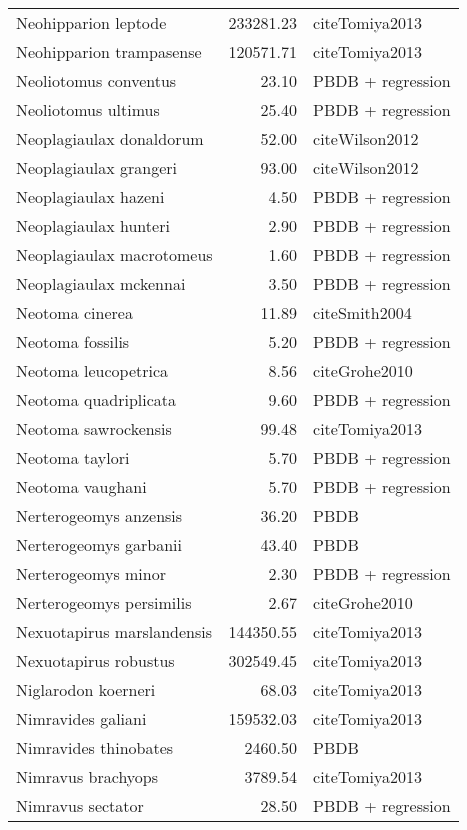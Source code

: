 \begin{table}[ht]
\begin{tabular}{lrl}
  Neohipparion leptode & 233281.23 & cite{Tomiya2013} \\ 
  Neohipparion trampasense & 120571.71 & cite{Tomiya2013} \\ 
  Neoliotomus conventus & 23.10 & PBDB + regression \\ 
  Neoliotomus ultimus & 25.40 & PBDB + regression \\ 
  Neoplagiaulax donaldorum & 52.00 & cite{Wilson2012} \\ 
  Neoplagiaulax grangeri & 93.00 & cite{Wilson2012} \\ 
  Neoplagiaulax hazeni & 4.50 & PBDB + regression \\ 
  Neoplagiaulax hunteri & 2.90 & PBDB + regression \\ 
  Neoplagiaulax macrotomeus & 1.60 & PBDB + regression \\ 
  Neoplagiaulax mckennai & 3.50 & PBDB + regression \\ 
  Neotoma cinerea & 11.89 & cite{Smith2004} \\ 
  Neotoma fossilis & 5.20 & PBDB + regression \\ 
  Neotoma leucopetrica & 8.56 & cite{Grohe2010} \\ 
  Neotoma quadriplicata & 9.60 & PBDB + regression \\ 
  Neotoma sawrockensis & 99.48 & cite{Tomiya2013} \\ 
  Neotoma taylori & 5.70 & PBDB + regression \\ 
  Neotoma vaughani & 5.70 & PBDB + regression \\ 
  Nerterogeomys anzensis & 36.20 & PBDB \\ 
  Nerterogeomys garbanii & 43.40 & PBDB \\ 
  Nerterogeomys minor & 2.30 & PBDB + regression \\ 
  Nerterogeomys persimilis & 2.67 & cite{Grohe2010} \\ 
  Nexuotapirus marslandensis & 144350.55 & cite{Tomiya2013} \\ 
  Nexuotapirus robustus & 302549.45 & cite{Tomiya2013} \\ 
  Niglarodon koerneri & 68.03 & cite{Tomiya2013} \\ 
  Nimravides galiani & 159532.03 & cite{Tomiya2013} \\ 
  Nimravides thinobates & 2460.50 & PBDB \\ 
  Nimravus brachyops & 3789.54 & cite{Tomiya2013} \\ 
  Nimravus sectator & 28.50 & PBDB + regression \\ 

\end{tabular}
\end{table}
